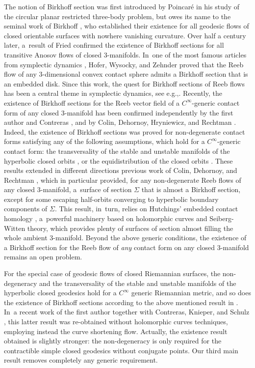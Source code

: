 \documentclass[11pt]{article}
\newcommand{\eg}{e.g.,\xspace}
\theoremstyle{plain}
\theoremstyle{definition}
\begin{document}
The notion of Birkhoff section was first introduced by Poincaré in his study of the circular planar restricted three-body problem, but owes its name to the seminal work of Birkhoff \cite{Birkhoff:1917aa}, who established their existence for all geodesic flows of closed orientable surfaces with nowhere vanishing curvature. Over half a century later, a~result of Fried \cite{Fried:1983aa} confirmed the existence of Birkhoff sections for all transitive Anosov flows of closed 3-manifolds. In~one of the most famous articles from symplectic dynamics \cite{Hofer:1998aa}, Hofer, Wysocky, and Zehnder proved that the Reeb flow of any 3-dimensional convex contact sphere admits a Birkhoff section that is an embedded disk. Since this work, the quest for Birkhoff sections of Reeb flows has been a central theme in symplectic dynamics, see \eg \cite{Salomao:2018aa, Hryniewicz:2023aa}. Recently, the existence of Birkhoff sections for the Reeb vector field of a $C^\infty$-generic contact form of any closed 3\nobreakdash-manifold has been confirmed independently by the first author and Contreras \cite{Contreras:2022aa}, and by Colin, Dehornoy, Hryniewicz, and Rechtman \cite{Colin:2024aa}. Indeed, the existence of Birkhoff sections was proved for non-degenerate contact forms satisfying any of the following assumptions, which hold for a $C^\infty$-generic contact form: the transversality of the stable and unstable manifolds of the hyperbolic closed orbits \cite{Contreras:2022aa}, or the equidistribution of the closed orbits \cite{Colin:2024aa}. These results extended in different directions previous work of Colin, Dehornoy, and Rechtman \cite{Colin:2023aa}, which in particular provided, for any non-degenerate Reeb flows of any closed 3-manifold, a~surface of section $\Sigma$ that is almost a Birkhoff section, except for some escaping half-orbits converging to hyperbolic boundary components of $\Sigma$. This result, in~turn, relies on Hutchings' embedded contact homology \cite{Hutchings:2014vp}, a~powerful machinery based on holomorphic curves and Seiberg-Witten theory, which provides plenty of surfaces of section almost filling the whole ambient 3-manifold. Beyond the above generic conditions, the existence of a Birkhoff section for the Reeb flow of \emph{any} contact form on any closed 3-manifold remains an open problem.

For the special case of geodesic flows of closed Riemannian surfaces, the non-degeneracy and the transversality of the stable and unstable manifolds of the hyperbolic closed geodesics hold for a $C^\infty$ generic Riemannian metric, and so does the existence of Birkhoff sections according to the above mentioned result in \cite{Contreras:2022aa}. In~a recent work of the first author together with Contreras, Knieper, and Schulz \cite{Contreras:2022ab}, this latter result was re-obtained without holomorphic curves techniques, employing instead the curve shortening flow. Actually, the existence result obtained is slightly stronger: the non-degeneracy is only required for the contractible simple closed geodesics without conjugate points. Our third main result removes completely any generic requirement.
\end{document}
